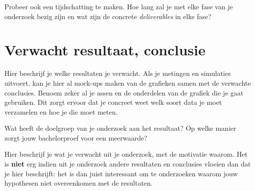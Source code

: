 Probeer ook een tijdschatting te maken. Hoe lang zal je met elke fase van je onderzoek bezig zijn en wat zijn de concrete \emph{deliverables} in elke fase?

\section{Verwacht resultaat, conclusie}%
\label{sec:verwachte_resultaten}

Hier beschrijf je welke resultaten je verwacht. Als je metingen en simulaties uitvoert, kan je hier al mock-ups maken van de grafieken samen met de verwachte conclusies. Benoem zeker al je assen en de onderdelen van de grafiek die je gaat gebruiken. Dit zorgt ervoor dat je concreet weet welk soort data je moet verzamelen en hoe je die moet meten.

Wat heeft de doelgroep van je onderzoek aan het resultaat? Op welke manier zorgt jouw bachelorproef voor een meerwaarde?

Hier beschrijf je wat je verwacht uit je onderzoek, met de motivatie waarom. Het is \textbf{niet} erg indien uit je onderzoek andere resultaten en conclusies vloeien dan dat je hier beschrijft: het is dan juist interessant om te onderzoeken waarom jouw hypothesen niet overeenkomen met de resultaten.

